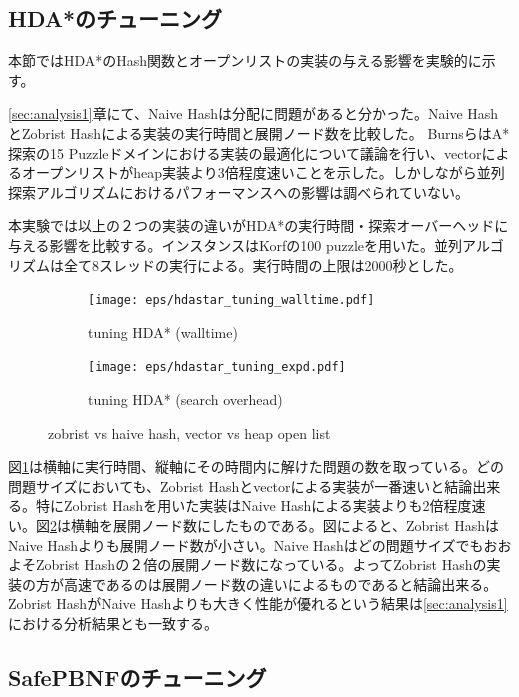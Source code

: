 \documentclass[uplatex]{jsarticle}
\begin{document}
\subsection{HDA*のチューニング}
\label{sec:hdastar_tuning}

本節ではHDA*のHash関数とオープンリストの実装の与える影響を実験的に示す。

\ref{sec:analysis1}章にて、Naive Hashは分配に問題があると分かった。Naive HashとZobrist Hashによる実装の実行時間と展開ノード数を比較した。
BurnsらはA*探索の15 Puzzleドメインにおける実装の最適化について議論を行い、vectorによるオープンリストがheap実装より3倍程度速いことを示した\cite{Burns2012implementing}。しかしながら並列探索アルゴリズムにおけるパフォーマンスへの影響は調べられていない。

本実験では以上の２つの実装の違いがHDA*の実行時間・探索オーバーヘッドに与える影響を比較する。インスタンスはKorfの100 puzzleを用いた\cite{korf1985depth}。並列アルゴリズムは全て8スレッドの実行による。実行時間の上限は2000秒とした。
\newline

\begin{figure}
	\centering
	\begin{subfigure}{0.4\columnwidth}
		\texttt{[image: eps/hdastar\_tuning\_walltime.pdf]}
		\caption{tuning HDA* (walltime)}
		\label{fig:hdastar_tuning_walltime}
	\end{subfigure}
	\begin{subfigure}{0.4\columnwidth}
		\texttt{[image: eps/hdastar\_tuning\_expd.pdf]}
		\caption{tuning HDA* (search overhead)}
		\label{fig:hdastar_tuning_expd}
	\end{subfigure}
	\caption{zobrist vs haive hash, vector vs heap open list}
	\label{fig:hdastar_tuning}
\end{figure}

図\ref{fig:hdastar_tuning_walltime}は横軸に実行時間、縦軸にその時間内に解けた問題の数を取っている。どの問題サイズにおいても、Zobrist Hashとvectorによる実装が一番速いと結論出来る。特にZobrist Hashを用いた実装はNaive Hashによる実装よりも2倍程度速い。図\ref{fig:hdastar_tuning_expd}は横軸を展開ノード数にしたものである。図によると、Zobrist HashはNaive Hashよりも展開ノード数が小さい。Naive Hashはどの問題サイズでもおおよそZobrist Hashの２倍の展開ノード数になっている。よってZobrist Hashの実装の方が高速であるのは展開ノード数の違いによるものであると結論出来る。Zobrist HashがNaive Hashよりも大きく性能が優れるという結果は\ref{sec:analysis1}における分析結果とも一致する。


\subsection{SafePBNFのチューニング}
\label{sec:pbnf_tuning}
\end{document}
